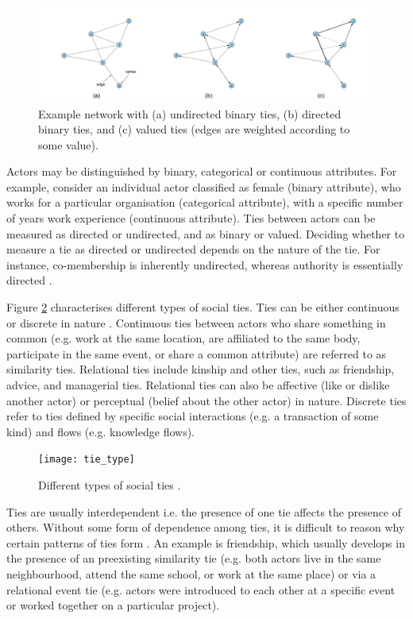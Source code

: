 \begin{figure}
	\centering
	\includegraphics[width=1.0\linewidth]{Images/example_networks.png}
	\caption{Example network with (a) undirected binary ties, (b) directed binary ties, and (c) valued ties (edges are weighted according to some value).}
	\label{fig:examples}
\end{figure}

 Actors may be distinguished by binary, categorical or continuous attributes. For example, consider an individual actor classified as female (binary attribute), who works for a particular organisation (categorical attribute), with a specific number of years work experience (continuous attribute). Ties between actors can be measured as directed or undirected, and as binary or valued. Deciding whether to measure a tie as directed or undirected depends on the nature of the tie. For instance, co-membership is inherently undirected, whereas authority is essentially directed \citep{borgatti2013analyzing}. \medskip
 
 Figure \ref{fig:tie_type} characterises different types of social ties. Ties can be either continuous or discrete in nature \citep{borgatti2013analyzing}. Continuous ties between actors who share something in common (e.g. work at the same location, are affiliated to the same body, participate in the same event, or share a common attribute) are referred to as similarity ties. Relational ties include kinship and other ties, such as friendship, advice, and managerial ties. Relational ties can also be affective (like or dislike another actor) or perceptual (belief about the other actor) in nature. Discrete ties refer to ties defined by specific social interactions (e.g. a transaction of some kind) and flows (e.g. knowledge flows). \medskip

\begin{figure}
	\centering
	\texttt{[image: tie\_type]}
	\caption{Different types of social ties \citep{borgatti2013analyzing}.}
	\label{fig:tie_type}
\end{figure}

Ties are usually interdependent i.e. the presence of one tie affects the presence of others. Without some form of dependence among ties, it is difficult to reason why certain patterns of ties form \citep{lusher2013exponential}. An example is friendship, which usually develops in the presence of an preexisting similarity tie (e.g. both actors live in the same neighbourhood, attend the same school, or work at the same place) or via a relational event tie (e.g. actors were introduced to each other at a specific event or worked together on a particular project). \medskip

